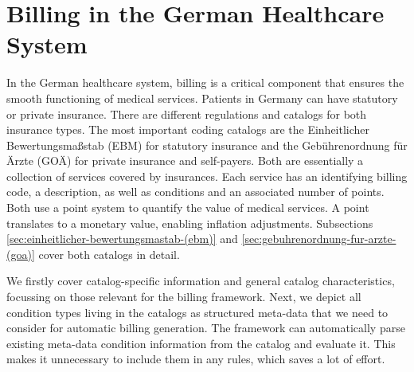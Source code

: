 \chapter{Billing in the German Healthcare System}\label{ch:billing-in-the-german-healthcare-system}

In the German healthcare system, billing is a critical component that ensures the smooth functioning of medical services.
Patients in Germany can have statutory or private insurance.
There are different regulations and catalogs for both insurance types.
The most important coding catalogs are the Einheitlicher Bewertungsmaßstab (EBM) for statutory insurance and the Gebührenordnung für Ärzte (GOÄ) for private insurance and self-payers.
Both are essentially a collection of services covered by insurances.
Each service has an identifying billing code, a description, as well as conditions and an associated number of points.
Both use a point system to quantify the value of medical services.
A point translates to a monetary value, enabling inflation adjustments.
Subsections \ref{sec:einheitlicher-bewertungsmastab-(ebm)} and \ref{sec:gebuhrenordnung-fur-arzte-(goa)} cover both catalogs in detail.

We firstly cover catalog-specific information and general catalog characteristics, focussing on those relevant for the billing framework.
Next, we depict all condition types living in the catalogs as structured meta-data that we need to consider for automatic billing generation.
The framework can automatically parse existing meta-data condition information from the catalog and evaluate it.
This makes it unnecessary to include them in any rules, which saves a lot of effort.



